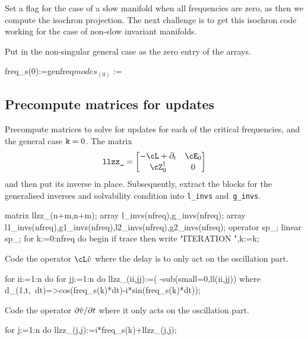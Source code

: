 \documentclass[11pt,a5paper]{article}
\newcommand{\adj}[1]{#1^\dagger} %
\begin{document}
Set a flag for the case of a slow manifold when all
frequencies are zero, as then we compute the isochron
projection. The next challenge is to get this isochron code
working for the case of non-slow invariant manifolds.

Put in the non-singular general case as the zero entry of
the arrays.
\begin{reduce}
freq_s(0):=genfreq$
modes_(0):={}$
\end{reduce}





\subsection{Precompute matrices for updates}

Precompute matrices to solve for updates for each of the
critical frequencies, and the general case $\verb|k|=0$. The
matrix 
\begin{equation*}
\verb|llzz_| = \begin{bmatrix} -\cL+\partial_t & \cE_0 
\\ \adj\cZ_0 & 0 \end{bmatrix}
\end{equation*}
and then put its inverse in place. Subsequently, extract the
blocks for the generalised inverses and solvability
condition into \verb|l_invs| and~\verb|g_invs|.
\begin{reduce}
matrix llzz_(n+m,n+m);
array l_invs(nfreq),g_invs(nfreq);
array l1_invs(nfreq),g1_invs(nfreq),l2_invs(nfreq),g2_invs(nfreq);
operator sp_; linear sp_;
for k:=0:nfreq do begin
  if trace then write "ITERATION ",k:=k; 
\end{reduce}

Code the operator \(\cL\hat v\) where the delay is to only
act on the oscillation part.
\begin{reduce}
  for ii:=1:n do for jj:=1:n do llzz_(ii,jj):=(
      -sub(small=0,ll(ii,jj))
      where d_(1,t,~dt)=>cos(freq_s(k)*dt)-i*sin(freq_s(k)*dt));
\end{reduce}

Code the operator \(\D t{\hat v}\) where it only acts on the
oscillation part.
\begin{reduce}
  for j:=1:n do llzz_(j,j):=i*freq_s(k)+llzz_(j,j);
\end{reduce}
\end{document}

